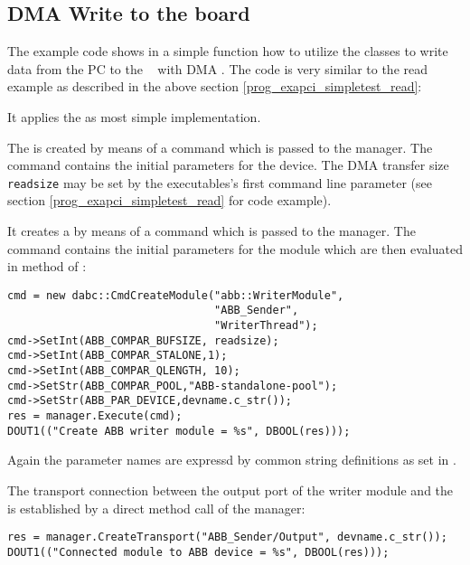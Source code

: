 \subsection{DMA Write to the board}
\label{prog_exapci_simpletest_write}
The example code  shows in a
simple  function how to utilize the
 classes to write data from the PC to the \ABB~ 
with DMA . 
The code is very similar to the read example as described
in the above section \ref{prog_exapci_simpletest_read}:

\begin{compactenum} 

\item It applies the  as most simple
 implementation.

\item The  is created by means of a command
 which is passed to the manager. The 
command contains the initial parameters for the device.
The DMA transfer size {\tt readsize} may be set by
the executables's first command line parameter
(see section \ref{prog_exapci_simpletest_read} for code example).

\item It creates a  by means of a command
 which is passed to the manager. The 
command contains the initial
parameters for the module which are then evaluated in 
method  of :
\begin{verbatim} 
cmd = new dabc::CmdCreateModule("abb::WriterModule",
                                "ABB_Sender", 
                                "WriterThread");
cmd->SetInt(ABB_COMPAR_BUFSIZE, readsize);
cmd->SetInt(ABB_COMPAR_STALONE,1);
cmd->SetInt(ABB_COMPAR_QLENGTH, 10);
cmd->SetStr(ABB_COMPAR_POOL,"ABB-standalone-pool");
cmd->SetStr(ABB_PAR_DEVICE,devname.c_str());
res = manager.Execute(cmd);
DOUT1(("Create ABB writer module = %s", DBOOL(res)));
\end{verbatim} 
Again the parameter names are expressd by 
common string definitions as set in . 

\item The transport connection between the output port of the writer module and
the  is established by a direct method call of the manager:
\begin{verbatim}
res = manager.CreateTransport("ABB_Sender/Output", devname.c_str());
DOUT1(("Connected module to ABB device = %s", DBOOL(res)));
\end{verbatim}  


\end{compactenum}
